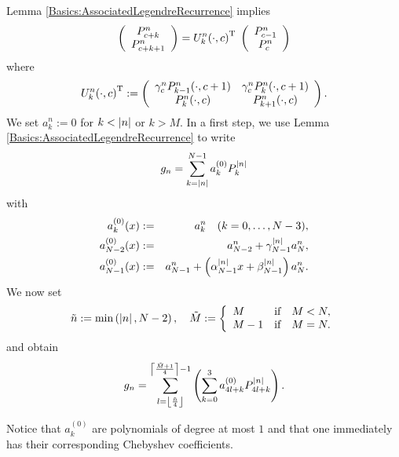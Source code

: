 Lemma \ref{Basics:AssociatedLegendreRecurrence} implies
\begin{equation}
  \label{NFSFT:U}
  \left(\begin{array}{c}
    P_{c+k}^n \\ P_{c+k+1}^n
  \end{array}\right)
  =
  U_{k}^{n}{\hspace{-0.4ex}}\left(\cdot,c\right)^{\text{\rm{T}}}\;
  \left(\begin{array}{c}
    P_{c-1}^n \\ P_{c}^n
  \end{array}\right)
\end{equation}
where
$$
  U_{k}^{n}{\hspace{-0.4ex}}\left(\cdot,c\right)^{\text{\rm{T}}} :=
  \left(\begin{array}{cc}
    \gamma_c^n P_{k-1}^n{\hspace{-0.4ex}}\left(\cdot,c+1\right) & \gamma_c^n P_{k}^n{\hspace{-0.4ex}}\left(\cdot,c+1\right) \\
                             P_{k}^n{\hspace{-0.4ex}}\left(\cdot,c\right)         &                         P_{k+1}^n{\hspace{-0.4ex}}\left(\cdot,c\right)
  \end{array}\right).   
$$
We set $a_k^n := 0$ for $k < \left\vert n\right\vert$ or $k > M$. In a first step, we use Lemma 
\ref{Basics:AssociatedLegendreRecurrence} to write
$$ g_n = \sum_{k = \left\vert n\right\vert}^{N-1} a_{k}^{(0)} P_k^{\left\vert n\right\vert}$$
with
\begin{eqnarray*}
  a_k^{(0)}{\hspace{-0.4ex}}\left(x\right)     & := & a_k^n \quad (k = 0,\ldots,N-3),\\
  a_{N-2}^{(0)}{\hspace{-0.4ex}}\left(x\right) & := & a_{N-2}^n + \gamma_{N-1}^{\left\vert n\right\vert} a_N^n,\\
  a_{N-1}^{(0)}{\hspace{-0.4ex}}\left(x\right) & := & a_{N-1}^n + \left(\alpha_{N-1}^{\left\vert n\right\vert}x + \beta_{N-1}^{\left\vert n\right\vert}\right) a_N^n.
\end{eqnarray*}
We now set 
$$\tilde{n} := \fun{\min}{\abs{n},N-2}, \quad \tilde{M} := \left\{\begin{array}{l@{\quad \text{if} \quad}l} M & M < N, \\ M-1 & M = N.\end{array}\right.$$
and obtain
$$
  g_n = \sum_{l = \left\lfloor\frac{\tilde{n}}{4}\right\rfloor}^{\left\lceil\frac{\tilde{M}+1}{4}\right\rceil-1} \left(\sum_{k=0}^{3} a_{4l+k}^{(0)} P_{4l+k}^{\left\vert n\right\vert}\right).
$$

Notice that $a_k^{(0)}$ are polynomials of 
degree at most $1$ and that one immediately has their corresponding Chebyshev coefficients.

